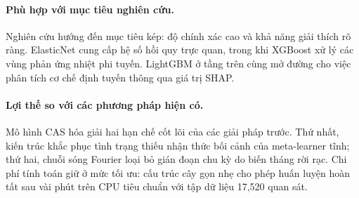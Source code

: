 \paragraph{Phù hợp với mục tiêu nghiên cứu.}
Nghiên cứu hướng đến mục tiêu kép: độ chính xác cao và khả năng giải thích rõ ràng. ElasticNet cung cấp hệ số hồi quy trực quan, trong khi XGBoost xử lý các vùng phản ứng nhiệt phi tuyến. LightGBM ở tầng trên cùng mở đường cho việc phân tích cơ chế định tuyến thông qua giá trị SHAP.

\paragraph{Lợi thế so với các phương pháp hiện có.}
Mô hình CAS hóa giải hai hạn chế cốt lõi của các giải pháp trước. Thứ nhất, kiến trúc khắc phục tình trạng thiếu nhận thức bối cảnh của meta-learner tĩnh; thứ hai, chuỗi sóng Fourier loại bỏ gián đoạn chu kỳ do biến tháng rời rạc. Chi phí tính toán giữ ở mức tối ưu: cấu trúc cây gọn nhẹ cho phép huấn luyện hoàn tất sau vài phút trên CPU tiêu chuẩn với tập dữ liệu 17,520 quan sát.

